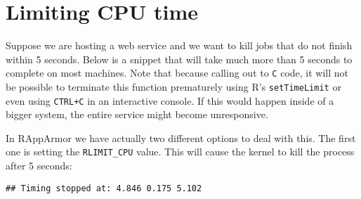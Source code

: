 \section{Limiting CPU time}
\label{cputime}

Suppose we are hosting a web service and we want to kill jobs that do not
finish within 5 seconds. Below is a snippet that will take much more than 5
seconds to complete on most machines. Note that because \R calling out to
\texttt{C} code, it will not be possible to terminate this function prematurely
using R's \texttt{setTimeLimit} or even using \texttt{CTRL+C} in an interactive
console. If this would happen inside of a bigger system, the entire service
might become unresponsive.

\begin{knitrout}\mycodesize
{}\color{fgcolor}\begin{kframe}
\begin{alltt}
 \hlkwb{<-} \hlstd{() \{}
     \hlkwb{<-} \hlstd{(}\hlstd{(}\hlstd{),} \hlstd{)}
     \hlkwb{<-} 
\hlstd{\}}
\end{alltt}
\end{kframe}
\end{knitrout}


In RAppArmor we have actually two different options to deal with this. The first
one is setting the \texttt{RLIMIT\_CPU} value. This will cause the kernel to
kill the process after 5 seconds:

\begin{knitrout}\mycodesize
{}\color{fgcolor}\begin{kframe}
\begin{alltt}
 \hlkwb{<-} \hlstd{(}\hlstd{(),}  \hlstd{=} \hlstd{))}
\end{alltt}

{\ttfamily\noindent\bfseries\color{errorcolor}{\#\# Error: R call did not return within 60 seconds. Terminating process.}}\begin{verbatim}
## Timing stopped at: 4.846 0.175 5.102
\end{verbatim}
\begin{alltt}
\end{alltt}


{\ttfamily\noindent\bfseries\color{errorcolor}{\#\# Error: object 'x' not found}}\end{kframe}
\end{knitrout}


